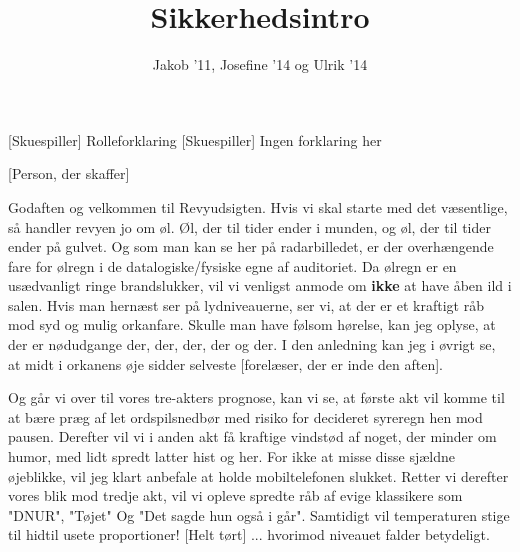 \documentclass[a4paper,11pt]{article}
\title{Sikkerhedsintro}
\author{Jakob '11, Josefine '14 og Ulrik '14}
\begin{document}
\maketitle

\begin{roles}
[Skuespiller] Rolleforklaring
[Skuespiller] Ingen forklaring her
\end{roles}

\begin{props}
[Person, der skaffer]
\end{props}


\begin{sketch}


 Godaften og velkommen til Revyudsigten.
 Hvis vi skal starte med det væsentlige, så handler revyen jo om øl. Øl, der til tider ender i munden, og øl, der til tider ender på gulvet.
   Og som man kan se her på radarbilledet, er der overhængende fare for ølregn i de datalogiske/fysiske egne af auditoriet. Da ølregn er en usædvanligt ringe brandslukker, vil vi venligst anmode om \textbf{ikke} at have åben ild i salen.
   Hvis man hernæst ser på lydniveauerne, ser vi, at der er et kraftigt råb mod syd og mulig orkanfare. Skulle man have følsom hørelse, kan jeg oplyse, at der er nødudgange der, der, der, der og der.
   I den anledning kan jeg i øvrigt se, at midt i orkanens øje sidder selveste [forelæser, der er inde den aften]. 

  Og går vi over til vores tre-akters prognose, kan vi se, at første akt vil komme til at bære præg af let ordspilsnedbør med risiko for decideret syreregn hen mod pausen. 
  Derefter vil vi i anden akt få kraftige vindstød af noget, der minder om humor, med lidt spredt latter hist og her. For ikke at misse disse sjældne øjeblikke, vil jeg klart anbefale at holde mobiltelefonen slukket. 
  Retter vi derefter vores blik mod tredje akt, vil vi opleve spredte råb af evige klassikere som "DNUR",
 "Tøjet"
 Og "Det sagde hun også i går".  Samtidigt vil temperaturen stige til hidtil usete proportioner!
[Helt tørt] ... hvorimod niveauet falder betydeligt.



\end{sketch}
\end{document}
